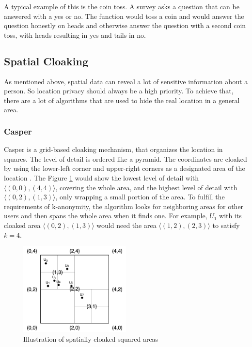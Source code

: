 A typical example of this is the coin toss. A survey asks a question that can be answered with a yes or no. The function would toss a coin and would answer the question honestly on heads and otherwise answer the question with a second coin toss, with heads resulting in yes and tails in no. 

\subsection{Spatial Cloaking}
As mentioned above, spatial data can reveal a lot of sensitive information about a person. So location privacy should always be a high priority. To achieve that, there are a lot of algorithms that are used to hide the real location in a general area.

\subsubsection{Casper}
Casper \cite{DBLP:journals/tods/ChowMA09} is a grid-based cloaking mechanism, that organizes the location in squares. The level of detail is ordered like a pyramid. The coordinates are cloaked by using the lower-left corner and upper-right corners as a designated area of the location \cite{DBLP:conf/ssd/TanLM09}. The Figure \ref{fig:casper} would show the lowest level of detail with \(\langle(0,0),(4,4)\rangle\), covering the whole area, and the highest level of detail with \(\langle(0,2),(1,3)\rangle\), only wrapping a small portion of the area. To fulfill the requirements of k-anonymity, the algorithm looks for neighboring areas for other users and then spans the whole area when it finds one. For example, \(U_1\) with its cloaked area \(\langle(0,2),(1,3)\rangle\) would need the area \(\langle(1,2),(2,3)\rangle\) to satisfy \(k=4\).

\begin{figure}[htpb]
  \centering
  \includegraphics[width=0.5\textwidth]{figures/casper.png}
  \caption{Illustration of spatially cloaked squared areas} 
  \label{fig:casper}
\end{figure}

